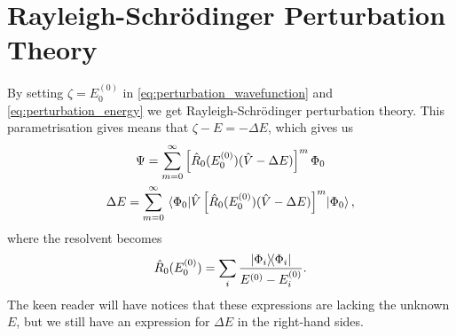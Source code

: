 \section{Rayleigh-Schrödinger Perturbation Theory}

By setting $\zeta = E_0^{(0)}$ in \autoref{eq:perturbation_wavefunction} and
\autoref{eq:perturbation_energy} we get Rayleigh-Schrödinger perturbation
theory\cite{rayleigh1894theory,schrodinger1926quantisierung}. This parametrisation 
gives means that $\zeta - E = - \Delta E$, which gives us 
\begin{gather}
    \label{eq:rspt_wavefunction}
    \Psi = \sum_{m=0}^\infty \left[ 
        \hat{R}_0(E^{(0)}_0) (\hat{V} - \Delta E)     
    \right]^m \Phi_0 \\
    \label{eq:rspt_energy}
    \Delta E =  \sum_{m=0}^\infty \mel*{\Phi_0}
    {
        \hat{V} \left[\hat{R}_0 (E^{(0)}_0)(\hat{V} - \Delta E) \right]^m
    }{\Phi_0},
\end{gather}
where the resolvent becomes
\begin{equation}
    \hat{R}_0(E^{(0)}_0) = \sum_i \frac{\dyad{\Phi_i}{\Phi_i}}{E^{(0)} - E^{(0)}_i}.
\end{equation}
The keen reader will have notices that these expressions are lacking the unknown 
$E$, but we still have an expression for $\Delta E$ in the right-hand sides.



